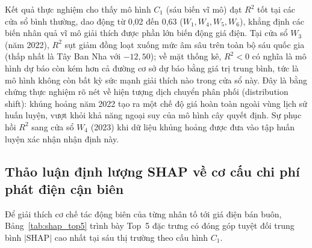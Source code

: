 Kết quả thực nghiệm cho thấy mô hình $C_1$ (sáu biến vĩ mô) đạt $R^2$ tốt tại các cửa sổ bình thường, dao động từ 0,02 đến 0,63 ($W_1, W_4, W_5, W_6$), khẳng định các biến nhân quả vĩ mô giải thích được phần lớn biến động giá điện. Tại cửa sổ $W_3$ (năm 2022), $R^2$ sụt giảm đồng loạt xuống mức âm sâu trên toàn bộ sáu quốc gia (thấp nhất là Tây Ban Nha với $-12{,}50$); về mặt thống kê, $R^2 < 0$ có nghĩa là mô hình dự báo còn kém hơn cả đường cơ sở dự báo bằng giá trị trung bình, tức là mô hình không còn bất kỳ sức mạnh giải thích nào trong cửa sổ này. Đây là bằng chứng thực nghiệm rõ nét về hiện tượng dịch chuyển phân phối (distribution shift): khủng hoảng năm 2022 tạo ra một chế độ giá hoàn toàn ngoài vùng lịch sử huấn luyện, vượt khỏi khả năng ngoại suy của mô hình cây quyết định. Sự phục hồi $R^2$ sang cửa sổ $W_4$ (2023) khi dữ liệu khủng hoảng được đưa vào tập huấn luyện xác nhận nhận định này.

\subsection{Thảo luận định lượng SHAP về cơ cấu chi phí phát điện cận biên}

Để giải thích cơ chế tác động biên của từng nhân tố tới giá điện bán buôn, Bảng~\ref{tab:shap_top5} trình bày Top~5 đặc trưng có đóng góp tuyệt đối trung bình $|\text{SHAP}|$ cao nhất tại sáu thị trường theo cấu hình $C_1$.

